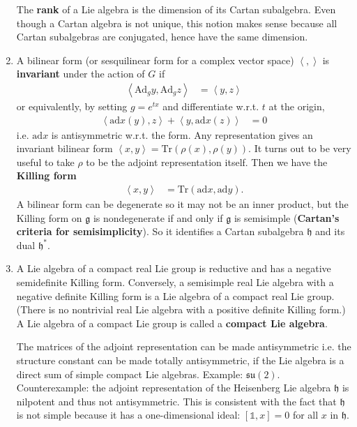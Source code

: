 \documentclass[aps,nofootinbib]{revtex4}
\begin{document}
\begin{enumerate}
The \textbf{rank }of a Lie algebra is the dimension of its Cartan
subalgebra. Even though a Cartan algebra is not unique, this notion
makes sense because all Cartan subalgebras are conjugated, hence have
the same dimension.

\item \label{Killing form} A bilinear form (or sesquilinear form for a complex vector space)
$\left\langle ,\right\rangle $ is \textbf{invariant }under the action
of $G$ if
\begin{align*}
\left\langle \mbox{Ad}_{g}y,\mbox{Ad}_{g}z\right\rangle  & =\left\langle y,z\right\rangle
\end{align*}
or equivalently, by setting $g=e^{tx}$ and differentiate w.r.t. $t$
at the origin,
\begin{align*}
\left\langle \mbox{ad}x\left(y\right),z\right\rangle +\left\langle y,\mbox{ad}x\left(z\right)\right\rangle  & =0
\end{align*}
i.e. $\text{ad}x$ is antisymmetric w.r.t. the form. Any representation gives an invariant bilinear form $\left\langle x,y\right\rangle =\mbox{Tr}\left(\rho\left(x\right),\rho\left(y\right)\right)$.
It turns out to be very useful to take $\rho$ to be the adjoint representation itself.
Then we have the \textbf{Killing form}
\begin{align*}
\left\langle x,y\right\rangle  & =\mbox{Tr}\left(\mbox{ad}x,\mbox{ad}y\right).
\end{align*}
A bilinear form can be degenerate so it may not be an inner product,
but the Killing form on $\mathfrak{g}$ is nondegenerate if and only
if $\mathfrak{g}$ is semisimple\textbf{ }(\textbf{Cartan's criteria
for semisimplicity}). So it identifies a Cartan subalgebra $\mathfrak{h}$
and its dual $\mathfrak{h}^{*}$.

\item \label{compact Lie algebra} 
A Lie algebra of a compact real Lie group is reductive and has a negative semidefinite Killing form. Conversely, a semisimple real Lie algebra with a negative definite Killing form is a Lie algebra of a compact real Lie group. (There is no nontrivial real Lie algebra with a positive definite Killing form.) A Lie algebra of a compact Lie group is called a {\bf compact Lie algebra}.

The matrices of the adjoint representation can be made antisymmetric i.e. the structure constant can be made totally antisymmetric, if the Lie algebra is a direct sum of simple compact Lie algebras. Example: $\mathfrak{su}(2)$. Counterexample: the adjoint representation of the Heisenberg Lie algebra $\mathfrak{h}$ is nilpotent and thus not antisymmetric. This is consistent with the fact that $\mathfrak{h}$ is not simple because it has a one-dimensional ideal: $[\mathbb{1},x]=0$ for all $x$ in $\mathfrak{h}$.


\end{enumerate}
\end{document}
